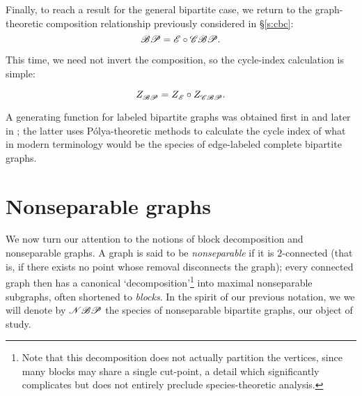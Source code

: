 \documentclass[distribution,draft]{brandiss} %
\numberwithin{section}{chapter}
\numberwithin{figure}{chapter}
\begin{document}
Finally, to reach a result for the general bipartite case, we return to the graph-theoretic composition relationship previously considered in \S \ref{s:cbc}:
\begin{equation*}
  \mathscr{BP} = \mathscr{E} \circ \mathscr{CBP}.
\end{equation*}

This time, we need not invert the composition, so the cycle-index calculation is simple:
\begin{theorem}
  \begin{equation}
     Z_{\mathscr{BP}}^{}  =  Z_{\mathscr{E}}^{}  \circ  Z_{\mathscr{CBP}}^{} .
  \end{equation}
\end{theorem}

A generating function for labeled bipartite graphs was obtained first in \cite{harprins:bipartite} and later in \cite{han:bipartite}; the latter uses P\'{o}lya-theoretic methods to calculate the cycle index of what in modern terminology would be the species of edge-labeled complete bipartite graphs.

\section{Nonseparable graphs}\label{s:nbp}
We now turn our attention to the notions of block decomposition and nonseparable graphs.
A graph is said to be \emph{nonseparable} if it is $2$-connected (that is, if there exists no point whose removal disconnects the graph); every connected graph then has a canonical `decomposition'\footnote{Note that this decomposition does not actually partition the vertices, since many blocks may share a single cut-point, a detail which significantly complicates but does not entirely preclude species-theoretic analysis.} into maximal nonseparable subgraphs, often shortened to \emph{blocks}.
In the spirit of our previous notation, we we will denote by $\mathscr{NBP}$ the species of nonseparable bipartite graphs, our object of study.
\end{document}
